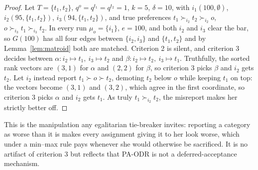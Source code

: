 \documentclass[a4paper,twoside]{article}
\newtheorem{example}{Example}
\theoremstyle{definition}
\begin{document}
\begin{proof}
Let $T=\{t_1,t_2\}$, $q^o=q^{t_1}=q^{t_2}=1$, $k=5$, $\delta=10$, with $i_1(100,\emptyset)$, $i_2(95,\{t_1,t_2\})$, $i_3(94,\{t_1,t_2\})$, and true preferences $t_1\succ_{i_2}t_2\succ_{i_2}o$, $o\succ_{i_3}t_1\succ_{i_3}t_2$. In every run $\mu_o=\{i_1\}$, $e=100$, and both $i_2$ and $i_3$ clear the bar, so $G(100)$ has all four edges between $\{i_2,i_3\}$ and $\{t_1,t_2\}$ and by Lemma~\ref{lem:matroid} both are matched. Criterion 2 is silent, and criterion 3 decides between $\alpha:i_2\mapsto t_1,\ i_3\mapsto t_2$ and $\beta:i_2\mapsto t_2,\ i_3\mapsto t_1$. Truthfully, the sorted rank vectors are $(3,1)$ for $\alpha$ and $(2,2)$ for $\beta$, so criterion 3 picks $\beta$ and $i_2$ gets $t_2$. Let $i_2$ instead report $t_1\succ o\succ t_2$, demoting $t_2$ below $o$ while keeping $t_1$ on top: the vectors become $(3,1)$ and $(3,2)$, which agree in the first coordinate, so criterion 3 picks $\alpha$ and $i_2$ gets $t_1$. As truly $t_1\succ_{i_2}t_2$, the misreport makes her strictly better off.
\end{proof}

This is the manipulation any egalitarian tie-breaker invites: reporting a category as worse than it is makes every assignment giving it to her look worse, which under a min--max rule pays whenever she would otherwise be sacrificed. It is no artifact of criterion 3 but reflects that PA-ODR is not a deferred-acceptance mechanism.




\end{document}

